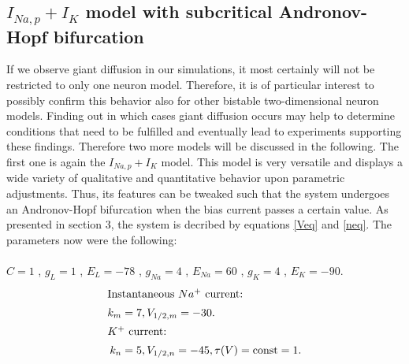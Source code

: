 \documentclass[12pt,a4paper]{article}
\begin{document}
\subsection{$I_{Na,p}+I_K$ model with subcritical Andronov-Hopf bifurcation}
If we observe giant diffusion in our simulations, it most certainly will not be restricted to only one neuron model. Therefore, it is of particular interest to possibly confirm this behavior also for other bistable two-dimensional neuron models. Finding out in which cases giant diffusion occurs may help to determine conditions that need to be fulfilled and eventually lead to experiments supporting these findings. Therefore two more models will be discussed in the following.
The first one is again the $I_{Na,p}+I_K$ model.
This model is very versatile and displays a wide variety of qualitative and quantitative behavior upon parametric adjustments. Thus, its features can be tweaked such that the system undergoes an Andronov-Hopf bifurcation when the bias current passes a certain value. As presented in section 3, the system is decribed by equations \ref{Veq} and \ref{neq}. The parameters now were the following:\\\\
$C=1$ , $g_L=1$ , $E_L=-78$ , $g_{Na}=4$ , $E_{Na}=60$ , $g_K=4$ , $E_K=-90$.
\begin{align*}
\intertext{Instantaneous $Na^+$ current:} k_m&=7 , V_{1/2,m}=-30. 
\\
\intertext{$K^+$ current:} k_n&=5 , V_{1/2,n}=-45 , \tau(V)=\text{const}=1.
\end{align*}
\end{document}
